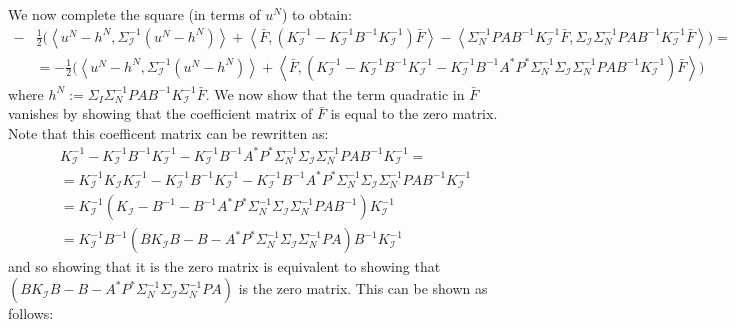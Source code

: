 \documentclass{article}
\theoremstyle{definition}
\theoremstyle{remark}
\begin{document}
We now complete the square (in terms of $u^{N}$) to obtain:
\begin{align}
    -&\frac{1}{2}\Big(\left\langle u^{N}-h^{N},\Sigma_{\mathcal{I}}^{-1}(u^{N}-h^{N}) \right\rangle + \left\langle \bar{F}, (K_{\mathcal{I}}^{-1}-K_{\mathcal{I}}^{-1}B^{-1}K_{\mathcal{I}}^{-1})\bar{F} \right\rangle - \left\langle \Sigma_{N}^{-1}PAB^{-1}K_{\mathcal{I}}^{-1}\bar{F},\Sigma_{\mathcal{I}}\Sigma_{N}^{-1}PAB^{-1}K_{\mathcal{I}}^{-1}\bar{F} \right\rangle \Big) = \nonumber \\
    &=-\frac{1}{2}\Big(\left\langle u^{N}-h^{N},\Sigma_{\mathcal{I}}^{-1}(u^{N}-h^{N}) \right\rangle + \left\langle \bar{F}, (K_{\mathcal{I}}^{-1}-K_{\mathcal{I}}^{-1}B^{-1}K_{\mathcal{I}}^{-1}-K_{\mathcal{I}}^{-1}B^{-1}A^{*}P^{*}\Sigma_{N}^{-1}\Sigma_{\mathcal{I}}\Sigma_{N}^{-1}PAB^{-1}K_{\mathcal{I}}^{-1})\bar{F} \right\rangle\Big)
\end{align}
where $h^{N}:=\Sigma_{I}\Sigma_{N}^{-1}PAB^{-1}K_{\mathcal{I}}^{-1}\bar{F}$. We now show that the term quadratic in $\bar{F}$ vanishes by showing that the coefficient matrix of $\bar{F}$ is equal to the zero matrix. Note that this coefficent matrix can be rewritten as:
\begin{align*}
    &K_{\mathcal{I}}^{-1}-K_{\mathcal{I}}^{-1}B^{-1}K_{\mathcal{I}}^{-1}-K_{\mathcal{I}}^{-1}B^{-1}A^{*}P^{*}\Sigma_{N}^{-1}\Sigma_{\mathcal{I}}\Sigma_{N}^{-1}PAB^{-1}K_{\mathcal{I}}^{-1} = \\
    &=K_{\mathcal{I}}^{-1}K_{\mathcal{I}}K_{\mathcal{I}}^{-1}-K_{\mathcal{I}}^{-1}B^{-1}K_{\mathcal{I}}^{-1}-K_{\mathcal{I}}^{-1}B^{-1}A^{*}P^{*}\Sigma_{N}^{-1}\Sigma_{\mathcal{I}}\Sigma_{N}^{-1}PAB^{-1}K_{\mathcal{I}}^{-1} \\
    &= K_{\mathcal{I}}^{-1}(K_{\mathcal{I}}-B^{-1}-B^{-1}A^{*}P^{*}\Sigma_{N}^{-1}\Sigma_{\mathcal{I}}\Sigma_{N}^{-1}PAB^{-1})K_{\mathcal{I}}^{-1} \\
    &=K_{\mathcal{I}}^{-1}B^{-1}(BK_{\mathcal{I}}B-B-A^{*}P^{*}\Sigma_{N}^{-1}\Sigma_{\mathcal{I}}\Sigma_{N}^{-1}PA)B^{-1}K_{\mathcal{I}}^{-1}
\end{align*}
and so showing that it is the zero matrix is equivalent to showing that $(BK_{\mathcal{I}}B-B-A^{*}P^{*}\Sigma_{N}^{-1}\Sigma_{\mathcal{I}}\Sigma_{N}^{-1}PA)$ is the zero matrix. This can be shown as follows:
\end{document}
